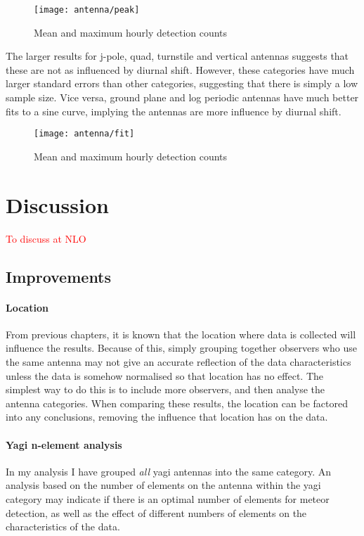 \begin{figure}[h!]
	\centering
	\texttt{[image: antenna/peak]}
	\caption{Mean and maximum hourly detection counts}
\end{figure}

The larger results for j-pole, quad, turnstile and vertical antennas suggests that these are not as influenced by diurnal shift. However, these categories have much larger standard errors than other categories, suggesting that there is simply a low sample size. Vice versa, ground plane and log periodic antennas have much better fits to a sine curve, implying the antennas are more influence by diurnal shift.
\begin{figure}[h!]
	\centering
	\texttt{[image: antenna/fit]}
	\caption{Mean and maximum hourly detection counts}
\end{figure}

\section{Discussion}
\textcolor{red}{To discuss at NLO}
\subsection{Improvements}
\paragraph{Location}
From previous chapters, it is known that the location where data is collected will influence the results. Because of this, simply grouping together observers who use the same antenna may not give an accurate reflection of the data characteristics unless the data is somehow normalised so that location has no effect. The simplest way to do this is to include more observers, and then analyse the antenna categories. When comparing these results, the location can be factored into any conclusions, removing the influence that location has on the data.
\paragraph{Yagi n-element analysis\\}
In my analysis I have grouped {\it all} yagi antennas into the same category. An analysis based on the number of elements on the antenna within the yagi category may indicate if there is an optimal number of elements for meteor detection, as well as the effect of different numbers of elements on the characteristics of the data.

